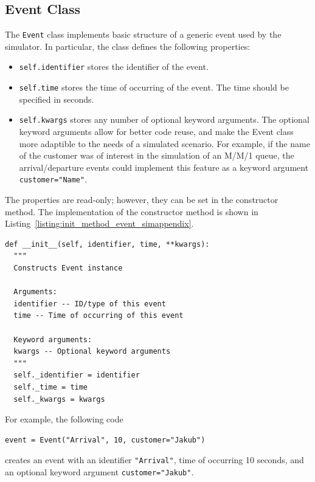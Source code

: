 \subsection{Event Class}
\label{sub:event_class_simappendix}
The \lstinline{Event} class implements basic structure of a generic event used by the simulator. In particular, the class defines the following properties:
\begin{itemize}
\item \lstinline{self.identifier} stores the identifier of the event.
\item \lstinline{self.time} stores the time of occurring of the event. The time should be specified in seconds. 
\item \lstinline{self.kwargs} stores any number of optional keyword arguments. The optional keyword arguments allow for better code reuse, and make the Event class more adaptible to the needs of a simulated scenario. For example, if the name of the customer was of interest in the simulation of an M/M/1 queue, the arrival/departure events could implement this feature as a keyword argument \lstinline{customer="Name"}.
\end{itemize}
The properties are read-only; however, they can be set in the constructor method. The implementation of the constructor method is shown in Listing~\ref{listing:init_method_event_simappendix}.
\begin{lstlisting}[caption=\lstinline{__init__(identifier, time, **kwargs)} member method of the \lstinline{Event} class, label=listing:init_method_event_simappendix]
def __init__(self, identifier, time, **kwargs):
  """
  Constructs Event instance
  
  Arguments:
  identifier -- ID/type of this event
  time -- Time of occurring of this event

  Keyword arguments:
  kwargs -- Optional keyword arguments
  """
  self._identifier = identifier
  self._time = time
  self._kwargs = kwargs
\end{lstlisting}
For example, the following code
\begin{lstlisting}[nolol, frame=none, numbers=none]
event = Event("Arrival", 10, customer="Jakub")
\end{lstlisting}
creates an event with an identifier \lstinline{"Arrival"}, time of occurring 10 seconds, and an optional keyword argument \lstinline{customer="Jakub"}.

